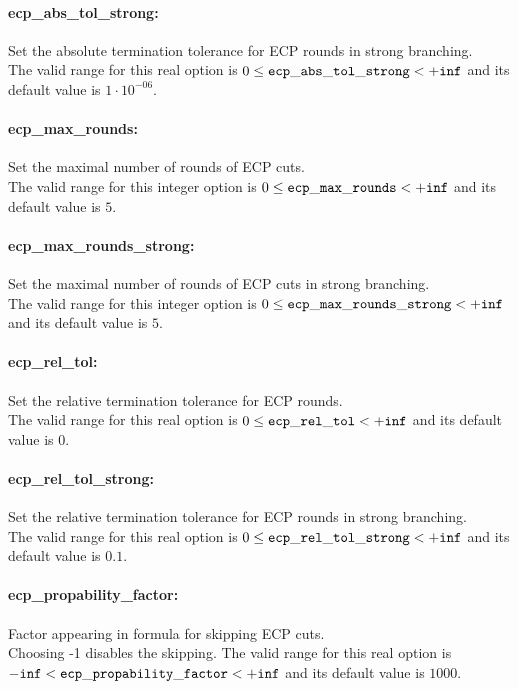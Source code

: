 \paragraph{ecp\_abs\_tol\_strong:} Set the absolute termination tolerance for ECP rounds in strong branching. $\;$ \\
 The valid range for this real option is 
$0 \le {\tt ecp\_abs\_tol\_strong } <  {\tt +inf}$
and its default value is $1 \cdot 10^{-06}$.


\paragraph{ecp\_max\_rounds:} Set the maximal number of rounds of ECP cuts. $\;$ \\
 The valid range for this integer option is
$0 \le {\tt ecp\_max\_rounds } <  {\tt +inf}$
and its default value is $5$.

\paragraph{ecp\_max\_rounds\_strong:} Set the maximal number of rounds of ECP cuts in strong branching. $\;$ \\
 The valid range for this integer option is
$0 \le {\tt ecp\_max\_rounds\_strong } <  {\tt +inf}$
and its default value is $5$.

\paragraph{ecp\_rel\_tol:} Set the relative termination tolerance for ECP rounds. $\;$ \\
 The valid range for this real option is 
$0 \le {\tt ecp\_rel\_tol } <  {\tt +inf}$
and its default value is $0$.

\paragraph{ecp\_rel\_tol\_strong:} Set the relative termination tolerance for ECP rounds in strong branching. $\;$ \\
 The valid range for this real option is 
$0 \le {\tt ecp\_rel\_tol\_strong } <  {\tt +inf}$
and its default value is $0.1$.

\paragraph{ecp\_propability\_factor:} Factor appearing in formula for skipping ECP cuts. $\;$ \\
 Choosing -1 disables the skipping. The valid range for this real option is 
${\tt -inf} <  {\tt ecp\_propability\_factor } <  {\tt +inf}$
and its default value is $1000$.

